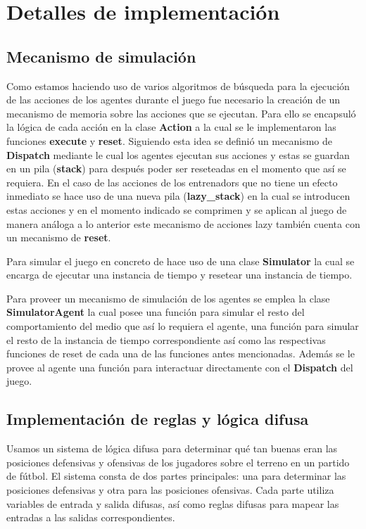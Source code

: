 \documentclass{article}
\begin{document}
\section{Detalles de implementación}

\subsection{Mecanismo de simulación}

Como estamos haciendo uso de varios algoritmos de búsqueda para la ejecución de las acciones de los agentes durante el juego
fue necesario la creación de un mecanismo de memoria sobre las acciones que se ejecutan. Para ello se encapsuló la lógica de cada 
acción en la clase \textbf{Action} a la cual se le implementaron las funciones \textbf{execute} y \textbf{reset}. Siguiendo esta idea se definió
un mecanismo de \textbf{Dispatch} mediante le cual los agentes ejecutan sus acciones y estas se guardan en un pila (\textbf{stack}) para después poder 
ser reseteadas en el momento que así se requiera. En el caso de las acciones de los entrenadors que no tiene un efecto inmediato se hace 
uso de una nueva pila (\textbf{lazy\_stack}) en la cual se introducen estas acciones y en el momento indicado se comprimen y se aplican
al juego de manera análoga a lo anterior este mecanismo de acciones lazy también cuenta con un mecanismo de \textbf{reset}.

Para simular el juego en concreto de hace uso de una clase \textbf{Simulator} la cual se encarga de ejecutar una instancia de tiempo
y resetear una instancia de tiempo.

Para proveer un mecanismo de simulación de los agentes se emplea la clase \textbf{SimulatorAgent} la cual posee una función para simular 
el resto del comportamiento del medio que así lo requiera el agente, una función para simular el resto de la instancia de tiempo correspondiente
así como las respectivas funciones de reset de cada una de las funciones antes mencionadas. Además se le provee al agente una función para interactuar
directamente con el \textbf{Dispatch} del juego.

\subsection{Implementación de reglas y lógica difusa}

Usamos un sistema de lógica difusa para determinar qué tan buenas eran las posiciones defensivas y ofensivas de los jugadores 
sobre el terreno en un partido de fútbol. El sistema consta de dos partes principales: una para determinar las posiciones 
defensivas y otra para las posiciones ofensivas. Cada parte utiliza variables de entrada y salida difusas, así como reglas 
difusas para mapear las entradas a las salidas correspondientes.
\end{document}
